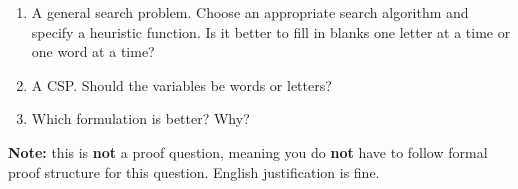 \documentclass[11pt]{article}
\begin{document}
\begin{enumerate}[label=\alph*]
    \item A general search problem. Choose an appropriate search algorithm and specify a heuristic function. Is it better to fill in blanks one letter at a time or one word at a time?
    \item A CSP. Should the variables be words or letters?
    \item Which formulation is better? Why?
\end{enumerate}

\noindent\textbf{Note:} this is \textbf{not} a proof question, meaning you do \textbf{not} have to follow formal proof structure for this question. English justification is fine.
\newpage
\end{document}
